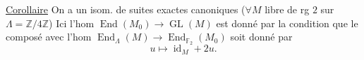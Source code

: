 \uline{Corollaire} On a un isom. de suites exactes canoniques ($\forall M$ libre de rg $2$ sur $\Lambda=\mathbb{Z}/4\mathbb{Z}$)
Ici l'hom $\operatorname{End}(M_0)\longrightarrow\operatorname{GL}(M)$ est donné par la condition que le composé avec l'hom $\operatorname{End}_\Lambda(M)\longrightarrow\operatorname{End}_{\mathbb{F}_2}(M_0)$ soit donné par
\[
u\longmapsto\operatorname{id}_M+2u.
\]

